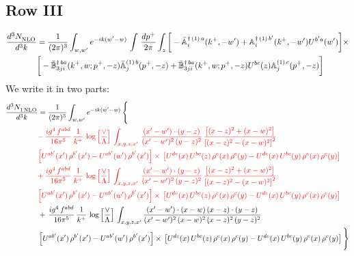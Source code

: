 \documentclass[9pt]{article}
\def\mf#1{\mathbb{#1}}
\numberwithin{equation}{section}
\begin{document}
\subsection{{\color{green}Row III}}
\begin{align}
\frac{d^{3}N_{\rm NLO}^{\rm}}{d^{3}k}  & = \frac{1}{(2\pi)^{3}}  \int_{w, w^\prime} e^{-ik(w^\prime-w)}\, \int\,\frac{dp^{+}}{2\pi} \int_{z} \bigg[-\bar{\mf{A}}^{\dagger\,(1)\,a}_{i}(k^{+},-w^{\prime})+\mf{A}^{\dagger\, (1)\, b^{\prime}}_{i}(k^{+},-w^{\prime})U^{b^{\prime}a}(w^{\prime})\bigg]\times \notag \\ &  \bigg[-\Bar{\mf{B}}^{\dagger\, ba}_{3ji}(k^{+}, w; p^{+}, -z)\Bar{\mf{A}}^{(1)\,b}_{j}(p^{+}, - z)+ \Bar{\mf{B}}^{\dagger\, ba}_{3ji}(k^{+},w; p^{+},-z) U^{bc}(z) \mf{A}^{(1)\, c}_{j}(p^{+},- z)\bigg]\nonumber
\end{align}
We write it in two parts: 
\begin{align}
   \frac{d^{3}N_{1\,\rm NLO}^{\rm}}{d^{3}k}  & = \frac{1}{(2\pi)^{3}}  \int_{w, w^\prime} e^{-ik(w^\prime-w)}\, \Bigg\{\notag \\ & {\color{red} -\,\frac{ig^{4}\,f^{abd}}{16\pi^{5}}\,\frac{1}{k^{+}}\,\log{\left[\frac{\vee}{\Lambda}\right]} \,\int_{x,y,z,x'}\, \frac{(x'-w')\cdot (y-z)}{(x'-w')^{2}\,(y-z)^{2}}\,\frac{\left[(x-z)^{2}+(x-w)^{2}\right]}{\left[(x-z)^{2}-(x-w)^{2}\right]^{2}}}\notag \\ & {\color{red} \left[U^{ab'}(x')\,\rho^{b'}(x')-U^{ab'}(w')\, \rho^{b'}(x')\right]\times\, \left[U^{de}(x)\,U^{bc}(z)\, \rho^{e}(x)\,\rho^{c}(y)-U^{de}(x)\,U^{bc}(y)\,\rho^{e}(x)\,\rho^{c}(y)\right]}\notag \\ & {\color{red}   +\,\frac{ig^{4}\,f^{abd}}{16\pi^{5}}\,\frac{1}{k^{+}}\,\log{\left[\frac{\vee}{\Lambda}\right]}\,\int_{x,y,z,x'}\, \frac{(x'-w')\cdot (y-z)}{(x'-w')^{2}\,(y-z)^{2}}\,\frac{\left[(x-z)^{2}+(x-w)^{2}\right]}{\left[(x-z)^{2}-(x-w)^{2}\right]^{2}}}\notag \\ & {\color{red}\left[U^{ab'}(x')\,\rho^{b'}(x')-U^{ab'}(w')\, \rho^{b'}(x')\right]\times\, \left[U^{de}(x)\,U^{bc}(z)\, \rho^{e}(x)\,\rho^{c}(y)-U^{de}(x)\,U^{bc}(y)\,\rho^{e}(x)\,\rho^{c}(y)\right]}\notag \\ &  +\, \frac{ig^{4}\,f^{abd}}{16\pi^{5}}\,\frac{1}{k^{+}}\,\log{\left[\frac{\vee}{\Lambda}\right]}\,\int_{x,y,z,x'} \frac{(x'-w')\cdot (x-w)\, (x-z)\cdot (y-z)}{(x'-w')^{2}\, (x-w)^{2}\, (x-z)^{2}\, (y-z)^{2}}\, \notag \\ & \left[U^{ab'}(x')\,\rho^{b'}(x')-U^{ab'}(w')\, \rho^{b'}(x')\right]\times\, \left[U^{de}(x)\,U^{bc}(z)\, \rho^{e}(x)\,\rho^{c}(y)-U^{de}(x)\,U^{bc}(y)\,\rho^{e}(x)\,\rho^{c}(y)\right]\Bigg\}
\end{align}
\end{document}
